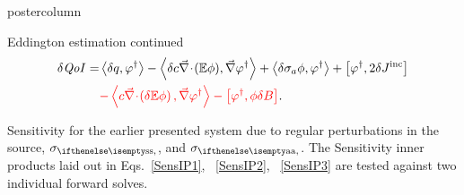 \documentclass[xcolor={usenames,dvipsnames,svgnames,table}]{beamer}
\newcommand{\bra}{\left\langle}
\newcommand{\ket}{\right\rangle}
\newcommand{\sbra}{\left[}
\newcommand{\sket}{\right]}
\newcommand{\Edd}{\mathbb{E}}
\newcommand{\BEdd}{B}
\newcommand{\isigt}{c}
\newcommand{\qoi}{{\it QoI}\xspace}
\newcommand{\tcr}[1]{\textcolor{red}{#1}}
\begin{document}
\begin{frame}
\begin{columns}
\begin{column}{.33\textwidth}
\begin{beamercolorbox}[center,wd=\textwidth]{postercolumn}
\begin{minipage}[T]{0.95\textwidth}
{\begin{block}{Eddington estimation continued}
\begin{equation}
\label{SensIP3}
\begin{split}
\delta \qoi =&  \bra \delta q , \varphi^\dag \ket - \bra \delta \isigt \div (\Edd \phi), \grad \varphi^\dag \ket + \bra \delta \sigma_a \phi, \varphi^\dag \ket + \sbra \varphi^\dag, 2 \delta J^{\text{inc}} \sket \\
& \tcr{ - \bra  \isigt \div \left( \delta \Edd \phi \right), \grad \varphi^\dag \ket
- \sbra \varphi^\dag, \phi \delta \BEdd \sket}.
\end{split}
\end{equation}			    
			    
Sensitivity for the earlier presented system due to regular perturbations in the source, $\sigs$, and $\siga$. The Sensitivity inner products laid out in Eqs.~\eqref{SensIP1}, ~\eqref{SensIP2}, ~\eqref{SensIP3} are tested against two individual forward solves.
 

\end{block}}
\end{minipage}
\end{beamercolorbox}
\end{column}
\end{columns}
\end{frame}
\end{document}
